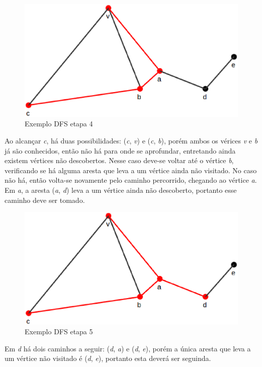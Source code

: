 \begin{figure}[!h]
	\centering
	\includegraphics[scale=0.4]{figuras/capitulo1/dfs/dfs4.eps}
	\caption{Exemplo DFS etapa 4}
	\label{dfs4}
\end{figure}

Ao alcançar \textit{c}, há duas possibilidades: (\textit{c}, \textit{v}) e (\textit{c}, \textit{b}), porém ambos os vérices \textit{v} e \textit{b} já são conhecidos, então não há para onde se aprofundar, entretando ainda existem vértices não descobertos. Nesse caso deve-se voltar até o vértice \textit{b}, verificando se há alguma aresta que leva a um vértice ainda não visitado. No caso não há, então volta-se novamente pelo caminho percorrido, chegando ao vértice \textit{a}. Em \textit{a}, a aresta (\textit{a}, \textit{d}) leva a um vértice ainda não descoberto, portanto esse caminho deve ser tomado.

\begin{figure}[!h]
	\centering
	\includegraphics[scale=0.4]{figuras/capitulo1/dfs/dfs5.eps}
	\caption{Exemplo DFS etapa 5}
	\label{dfs5}
\end{figure}

Em \textit{d} há dois caminhos a seguir: (\textit{d}, \textit{a}) e (\textit{d}, \textit{e}), porém a única aresta que leva a um vértice não visitado é (\textit{d}, \textit{e}), portanto esta deverá ser seguinda.

